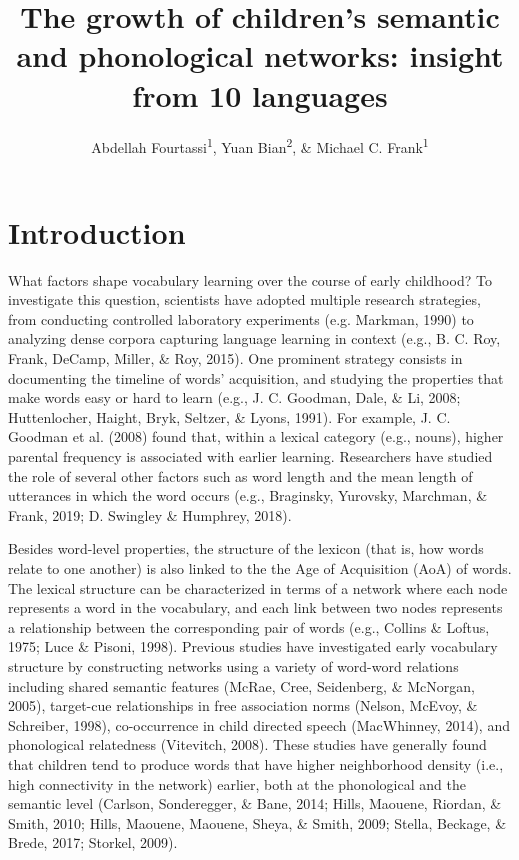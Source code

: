 \documentclass[english,floatsintext,man]{apa6}
\title{The growth of children's semantic and phonological networks: insight
from 10 languages}
\author{Abdellah Fourtassi\textsuperscript{1}, Yuan Bian\textsuperscript{2}, \& Michael C. Frank\textsuperscript{1}}
\affiliation{
    \vspace{0.5cm}
          \textsuperscript{1} Department of Psychology, Stanford University\\
          \textsuperscript{2} Department of Brain and Cognitive Sciences, Massachusetts Institute of
Technology  }
\theoremstyle{definition}
\theoremstyle{definition}
\theoremstyle{definition}
\theoremstyle{remark}
\begin{document}
\maketitle

\setcounter{secnumdepth}{0}



\section{Introduction}\label{introduction}

What factors shape vocabulary learning over the course of early
childhood? To investigate this question, scientists have adopted
multiple research strategies, from conducting controlled laboratory
experiments (e.g. Markman, 1990) to analyzing dense corpora capturing
language learning in context (e.g., B. C. Roy, Frank, DeCamp, Miller, \&
Roy, 2015). One prominent strategy consists in documenting the timeline
of words' acquisition, and studying the properties that make words easy
or hard to learn (e.g., J. C. Goodman, Dale, \& Li, 2008; Huttenlocher,
Haight, Bryk, Seltzer, \& Lyons, 1991). For example, J. C. Goodman et
al. (2008) found that, within a lexical category (e.g., nouns), higher
parental frequency is associated with earlier learning. Researchers have
studied the role of several other factors such as word length and the
mean length of utterances in which the word occurs (e.g., Braginsky,
Yurovsky, Marchman, \& Frank, 2019; D. Swingley \& Humphrey, 2018).

Besides word-level properties, the structure of the lexicon (that is,
how words relate to one another) is also linked to the the Age of
Acquisition (AoA) of words. The lexical structure can be characterized
in terms of a network where each node represents a word in the
vocabulary, and each link between two nodes represents a relationship
between the corresponding pair of words (e.g., Collins \& Loftus, 1975;
Luce \& Pisoni, 1998). Previous studies have investigated early
vocabulary structure by constructing networks using a variety of
word-word relations including shared semantic features (McRae, Cree,
Seidenberg, \& McNorgan, 2005), target-cue relationships in free
association norms (Nelson, McEvoy, \& Schreiber, 1998), co-occurrence in
child directed speech (MacWhinney, 2014), and phonological relatedness
(Vitevitch, 2008). These studies have generally found that children tend
to produce words that have higher neighborhood density (i.e., high
connectivity in the network) earlier, both at the phonological and the
semantic level (Carlson, Sonderegger, \& Bane, 2014; Hills, Maouene,
Riordan, \& Smith, 2010; Hills, Maouene, Maouene, Sheya, \& Smith, 2009;
Stella, Beckage, \& Brede, 2017; Storkel, 2009).
\end{document}
